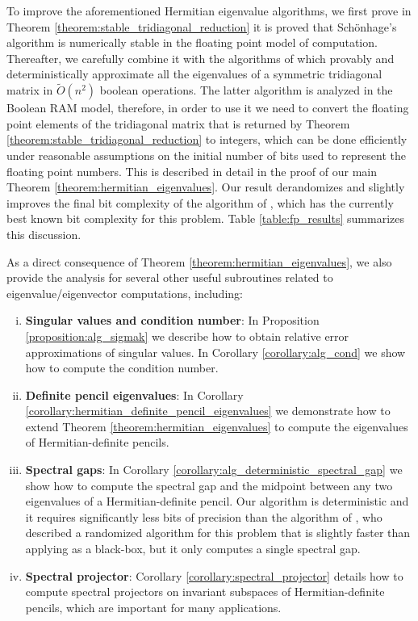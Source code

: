 \documentclass{article}
\begin{document}
To improve the aforementioned Hermitian eigenvalue algorithms,
we first prove in Theorem \ref{theorem:stable_tridiagonal_reduction} it is proved that Schönhage's algorithm is numerically stable in the floating point model of computation. Thereafter, we carefully combine it with the algorithms of \cite{bini1991parallel,bini1992practical,bini1998computing} which provably and deterministically approximate all the eigenvalues of a symmetric tridiagonal matrix in $\widetilde O(n^2)$ boolean operations. The latter algorithm is analyzed in the Boolean RAM model, therefore, in order to use it we need to convert the floating point elements of the tridiagonal matrix that is returned by Theorem \ref{theorem:stable_tridiagonal_reduction} to integers, which can be done efficiently under reasonable assumptions on the initial number of bits used to represent the floating point numbers. 
This is described in detail in the proof of our main Theorem \ref{theorem:hermitian_eigenvalues}. Our result derandomizes and slightly improves the final bit complexity of the algorithm of \cite{shah2025hermitian}, which has the currently best known bit complexity for this problem. 
Table 
\ref{table:fp_results} summarizes this discussion.

As a direct consequence of Theorem \ref{theorem:hermitian_eigenvalues}, we also provide the analysis for several other useful subroutines related to eigenvalue/eigenvector computations, including:
\begin{enumerate}[(i)]
    \item \textbf{Singular values and condition number}: In Proposition \ref{proposition:alg_sigmak} we describe how to obtain relative error approximations of singular values. In Corollary \ref{corollary:alg_cond} we show how to compute the condition number.
    \item\textbf{Definite pencil eigenvalues}: In Corollary \ref{corollary:hermitian_definite_pencil_eigenvalues} we demonstrate how to extend Theorem \ref{theorem:hermitian_eigenvalues} to compute the eigenvalues of Hermitian-definite pencils. 
    \item\textbf{Spectral gaps}: In Corollary \ref{corollary:alg_deterministic_spectral_gap} we show how to compute the spectral gap and the midpoint between any two eigenvalues of a Hermitian-definite pencil. Our algorithm is deterministic and it requires significantly less bits of precision than the algorithm of \cite{sobczyk2024invariant}, who described a randomized algorithm for this problem that is slightly faster than applying \cite{banks2022pseudospectral} as a black-box, but it only computes a single spectral gap.
    \item\textbf{Spectral projector}: Corollary \ref{corollary:spectral_projector} details how to compute spectral projectors on invariant subspaces of Hermitian-definite pencils, which are important for many applications.
\end{enumerate}
\end{document}

